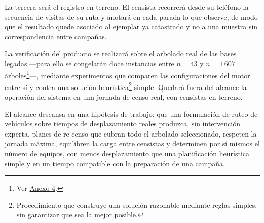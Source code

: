 La tercera será el registro en terreno. El censista recorrerá desde su teléfono la secuencia de
visitas de su ruta y anotará en cada parada lo que observe, de modo que el resultado quede asociado
al ejemplar ya catastrado y no a una muestra sin correspondencia entre campañas.

La verificación del producto se realizará sobre el arbolado real de las bases legadas ---para ello
se congelarán doce instancias entre $n=43$ y $n=1\,607$ árboles\footnote{Ver
\hyperref[anx:suite-instancias]{Anexo 4}.}---, mediante experimentos que comparen las
configuraciones del motor entre sí y contra una solución heurística\footnote{Procedimiento que
construye una solución razonable mediante reglas simples, sin garantizar que sea la mejor posible.}
simple. Quedará fuera del alcance la operación del sistema en una jornada de censo real, con
censistas en terreno.

El alcance descansa en una hipótesis de trabajo: que una formulación de ruteo de vehículos sobre
tiempos de desplazamiento reales produzca, sin intervención experta, planes de re-censo que cubran
todo el arbolado seleccionado, respeten la jornada máxima, equilibren la carga entre censistas y
determinen por sí mismos el número de equipos, con menos desplazamiento que una planificación
heurística simple y en un tiempo compatible con la preparación de una campaña.
